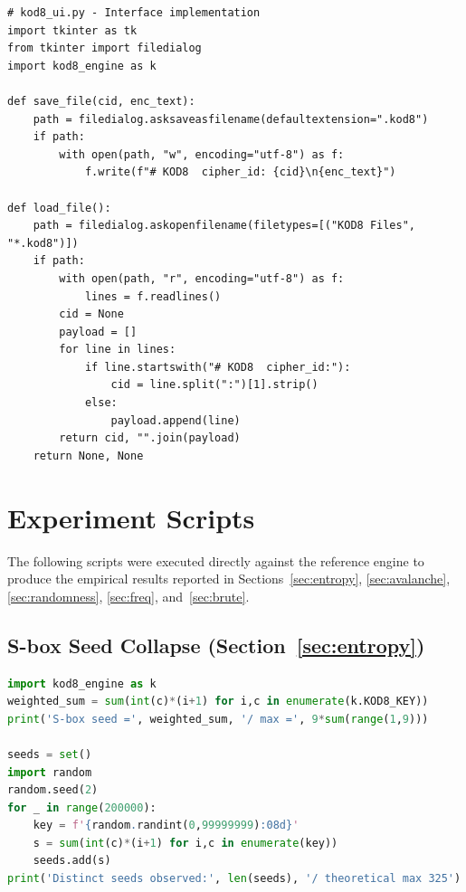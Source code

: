\documentclass[11pt]{article}
\begin{document}
\begin{lstlisting}[style=appendixcode]
# kod8_ui.py - Interface implementation
import tkinter as tk
from tkinter import filedialog
import kod8_engine as k

def save_file(cid, enc_text):
    path = filedialog.asksaveasfilename(defaultextension=".kod8")
    if path:
        with open(path, "w", encoding="utf-8") as f:
            f.write(f"# KOD8  cipher_id: {cid}\n{enc_text}")

def load_file():
    path = filedialog.askopenfilename(filetypes=[("KOD8 Files", "*.kod8")])
    if path:
        with open(path, "r", encoding="utf-8") as f:
            lines = f.readlines()
        cid = None
        payload = []
        for line in lines:
            if line.startswith("# KOD8  cipher_id:"):
                cid = line.split(":")[1].strip()
            else:
                payload.append(line)
        return cid, "".join(payload)
    return None, None
\end{lstlisting}

\newpage
\section{Experiment Scripts}
\label{app:scripts}

The following scripts were executed directly against the reference
engine to produce the empirical results reported in
Sections~\ref{sec:entropy}, \ref{sec:avalanche}, \ref{sec:randomness},
\ref{sec:freq}, and~\ref{sec:brute}.

\subsection{S-box Seed Collapse (Section~\ref{sec:entropy})}
\begin{lstlisting}[language=Python]
import kod8_engine as k
weighted_sum = sum(int(c)*(i+1) for i,c in enumerate(k.KOD8_KEY))
print('S-box seed =', weighted_sum, '/ max =', 9*sum(range(1,9)))

seeds = set()
import random
random.seed(2)
for _ in range(200000):
    key = f'{random.randint(0,99999999):08d}'
    s = sum(int(c)*(i+1) for i,c in enumerate(key))
    seeds.add(s)
print('Distinct seeds observed:', len(seeds), '/ theoretical max 325')
\end{lstlisting}
\end{document}

